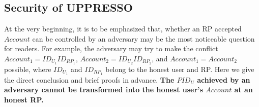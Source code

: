 \begin{comment}
 Below is a brief description about the processes and scripts in UPPRESSO.
\vspace{-\topsep}
\begin{itemize}
\item A browser is an atomic process, which is responsible for sending HTTP requests, receiving HTTP responses, handling user actions, and transmitting messages between scripting processes. As the browsers are considered honest, in the remaining analysis, we focus only on the scripting processes running in the browsers. We refer interested readers to Appendix C and \cite{SPRESSO} for more details about the browser process.
\item The IdP server process (defined as $p^i$) only accepts the events whose message is an HTTP request with a path in the set of {\sf \{/script, /dynamicRegistration, /login, /loginInfo, /authorize\}}. %
All the events can be accepted by $p^i$ in any state, but the output may vary. %
\item The RP server process (denoted as $p^r$) only accepts the events whose message is an HTTP request with a path in {\sf \{/script, /login, /startNegotiation, /registrationResult, /uploadToken\}}. %
However, an event with a path in {\sf \{ /script, /login, /startNegotiation\}} can be accepted in any state, while an event with a path $\equiv$ {\sf /registrationResult} is accepted only when the state $s$ is the output of an event whose path $\equiv$ {\sf /startNegotiation}. Similarly, the following accepted events should have a path in {\sf \{/registrationResult, /uploadToken\}}.
\item The IdP and RP scripting processes accept the events in the form of HTTP response and postMessage. %
\end{itemize}
\end{comment}

\subsection{Security of UPPRESSO}
At the very beginning, it is to be emphasized that, whether an RP accepted $Account$ can be controlled by an adversary may be the most noticeable question for readers.
For example, the adversary may try to make the conflict $Account_1=ID_{U_1}ID_{RP_1}$, $Account_2=ID_{U_2}ID_{RP_2}$, and $Account_1=Account_2$ possible, where $ID_{U_1}$ and $ID_{RP_1}$ belong to the honest user and RP.
Here we give the direct conclusion and brief proofs in advance. \textbf{The $PID_U$ achieved by an adversary cannot be transformed into the honest user's $Account$ at an honest RP.}

